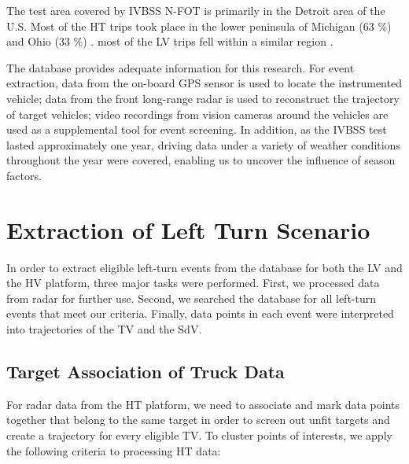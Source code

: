 \documentclass[letterpaper, 10 pt, conference]{ieeeconf}
\begin{document}
The test area covered by IVBSS N-FOT is primarily in the Detroit area of the U.S. Most of the HT trips took place in the lower peninsula of Michigan (63 $\%$) and Ohio (33 $\%$) \cite{JamesR.SayerScottE.BogardDillonFunkhouserDavidJ.LeBlancShanBaoAdamD.BlankespoorMaryLynnBuonarosa2010}. most of the LV trips fell within a similar region \cite{Sayer2010}. 




%
%
%
%
%
%
The database provides adequate information for this research. For event extraction, data from the on-board GPS sensor is used to locate the instrumented vehicle; data from the front long-range radar is used to reconstruct the trajectory of target vehicles; video recordings from vision cameras around the vehicles are used as a supplemental tool for event screening. In addition, as the IVBSS test lasted approximately one year, driving data under a variety of weather conditions throughout the year were covered, enabling us to uncover the influence of season factors. 

 

\section{Extraction of Left Turn Scenario }
In order to extract eligible left-turn events from the database for both the LV and the HV platform, three major tasks were performed. First, we processed data from radar for further use. Second, we searched the database for all left-turn events that meet our criteria. Finally, data points in each event were interpreted into trajectories of the TV and the SdV.

\subsection{Target Association of Truck Data}

For radar data from the HT platform, we need to associate and mark data points together that belong to the same target in order to screen out unfit targets and create a trajectory for every eligible TV. 
To cluster points of interests, we apply the following criteria to processing HT data:
\end{document}
